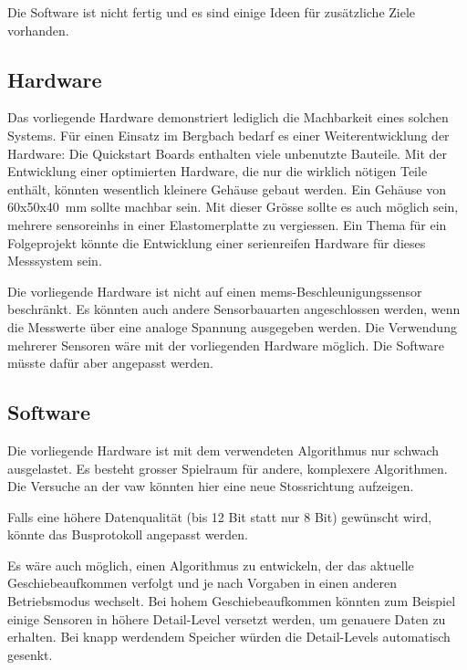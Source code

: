 Die Software ist nicht fertig und es sind einige Ideen für zusätzliche Ziele vorhanden.

\subsection{Hardware}
Das vorliegende Hardware demonstriert lediglich die Machbarkeit eines solchen Systems. Für einen Einsatz im Bergbach bedarf es einer Weiterentwicklung der Hardware: Die Quickstart Boards enthalten viele unbenutzte Bauteile. Mit der Entwicklung einer optimierten Hardware, die nur die wirklich nötigen Teile enthält, könnten wesentlich kleinere Gehäuse gebaut werden. Ein Gehäuse von 60x50x40~mm sollte machbar sein. Mit dieser Grösse sollte es auch möglich sein, mehrere \glspl{sensoreinh} in einer Elastomerplatte zu vergiessen. Ein Thema für ein Folgeprojekt könnte die Entwicklung einer serienreifen Hardware für dieses Messsystem sein.

Die vorliegende Hardware ist nicht auf einen \gls{mems}-Beschleunigungssensor beschränkt. Es könnten auch andere Sensorbauarten angeschlossen werden, wenn die Messwerte über eine analoge Spannung ausgegeben werden. Die Verwendung mehrerer Sensoren wäre mit der vorliegenden Hardware möglich. Die Software müsste dafür aber angepasst werden.

\subsection{Software}
Die vorliegende Hardware ist mit dem verwendeten Algorithmus nur schwach ausgelastet. Es besteht grosser Spielraum für andere, komplexere Algorithmen. Die Versuche an der \gls{vaw} könnten hier eine neue Stossrichtung aufzeigen.

Falls eine höhere Datenqualität (bis 12 Bit statt nur 8 Bit) gewünscht wird, könnte das Busprotokoll angepasst werden.

Es wäre auch möglich, einen Algorithmus zu entwickeln, der das aktuelle Geschiebeaufkommen verfolgt und je nach Vorgaben in einen anderen Betriebsmodus wechselt. Bei hohem Geschiebeaufkommen könnten zum Beispiel einige Sensoren in höhere Detail-Level versetzt werden, um genauere Daten zu erhalten. Bei knapp werdendem Speicher würden die Detail-Levels automatisch gesenkt.

